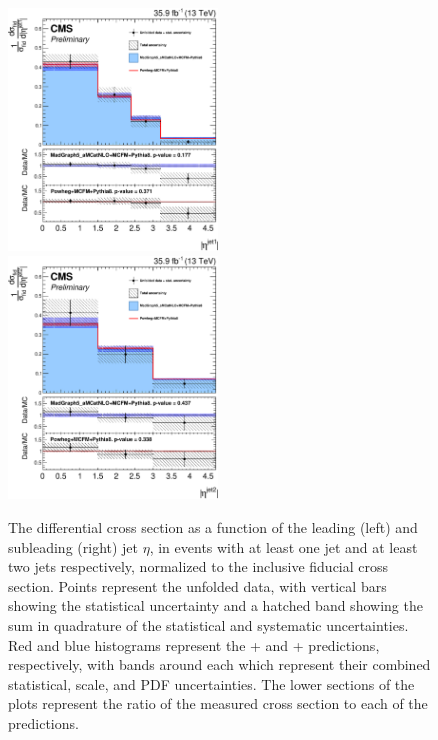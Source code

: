 \begin{figure}[htbp]
  \begin{center}
    \includegraphics[width=0.495\textwidth]{results/unfold_j1Eta.pdf}
    \includegraphics[width=0.495\textwidth]{results/unfold_j2Eta.pdf}
    \caption[Normalized differential {\ZZ} cross sections as functions of leading and subleading jet pseudorapidity]{
        The {\ZZ} differential cross section as a function of the leading (left) and subleading (right) jet {$\eta$}, in {\ZZ} events with at least one jet and at least two jets respectively, normalized to the inclusive fiducial cross section.
        Points represent the unfolded data, with vertical bars showing the statistical uncertainty and a hatched band showing the sum in quadrature of the statistical and systematic uncertainties.
        Red and blue histograms represent the {\POWHEG}+{\MCFM} and {\MGAMC}+{\MCFM} predictions, respectively, with bands around each which represent their combined statistical, scale, and PDF uncertainties.
        The lower sections of the plots represent the ratio of the measured cross section to each of the predictions.
      }\label{fig:unfold_jEta}
  \end{center}
\end{figure}

